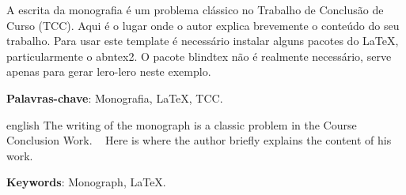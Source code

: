 \documentclass[
	12pt,			%
	openany,		%
	oneside,		%
	a4paper,		%
	english,		%
	brazil			%
	]{abntex2}
\begin{document}
\setlength{\absparsep}{18pt} %

\begin{resumo}
 A escrita da monografia é um problema clássico no Trabalho de Conclusão de Curso (TCC).
 Aqui é o lugar onde o autor explica brevemente o conteúdo do seu trabalho. Para usar este
 template é necessário instalar alguns pacotes do LaTeX, particularmente o abntex2. O pacote
 blindtex não é realmente necessário, serve apenas para gerar lero-lero neste exemplo.
 
 \textbf{Palavras-chave}: Monografia, LaTeX, TCC.
\end{resumo}

\begin{resumo}[Abstract]
 \begin{otherlanguage*}{english}
  The writing of the monograph is a classic problem in the Course Conclusion Work.
  Here is where the author briefly explains the content of his work.
 
 \textbf{Keywords}: Monograph, LaTeX.
 \end{otherlanguage*}
\end{resumo}


\listoffigures*
\cleardoublepage




\tableofcontents*
\cleardoublepage

\textual







\postextual







\printindex
\end{document}
